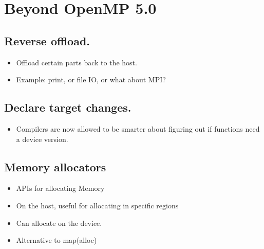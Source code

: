 
\chapter{Beyond OpenMP 5.0}
\label{chapter:future}


\section{Reverse offload.}
\begin{itemize}
    \item Offload certain parts back to the host.
    \item Example: print, or file IO, or what about MPI?
\end{itemize}

\section{Declare target changes.}
\begin{itemize}
    \item Compilers are now allowed to be smarter about figuring out if functions need a device version.
\end{itemize}

\section{Memory allocators}
\begin{itemize}
    \item APIs for allocating Memory
    \item On the host, useful for allocating in specific regions
    \item Can allocate on the device.
    \item Alternative to map(alloc)
\end{itemize}


